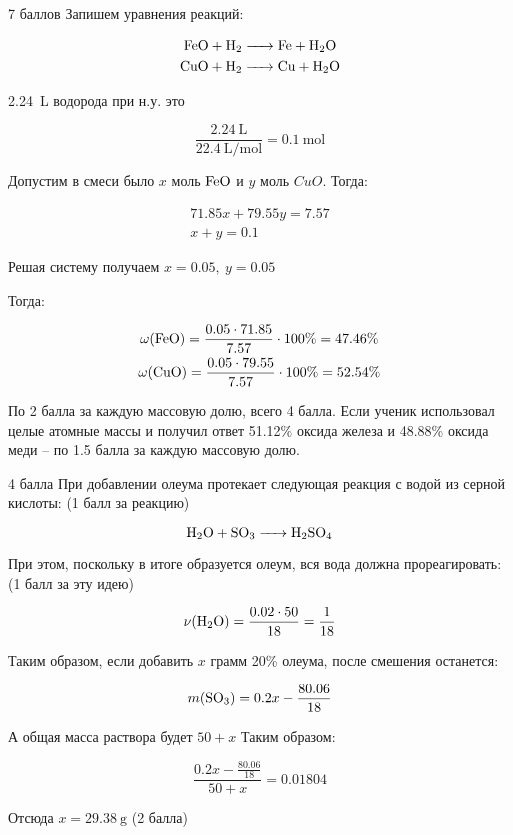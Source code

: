 \begin{solbox}{7 баллов}
  Запишем уравнения реакций:

  \begin{gather*}
    \ce{FeO + H2 -> Fe + H2O} \\
    \ce{CuO + H2 -> Cu + H2O}
  \end{gather*}

  \qty{2.24}{\liter} водорода при н.у. это

  \[
    \frac{\qty{2.24}{\liter}}{\qty{22.4}{\liter\per\mole}} = \qty{0.1}{\mole}
  \]

  Допустим в смеси было $x$ моль $\ce{FeO}$ и $y$ моль $CuO$. Тогда:

  \begin{gather*}
    71.85x + 79.55y = 7.57 \\
    x + y = 0.1
  \end{gather*}

  Решая систему получаем $x = 0.05, \ y = 0.05$

  Тогда:

  \begin{gather*}
    \omega(\ce{FeO}) = \frac{0.05 \cdot 71.85}{7.57} \cdot 100\% = 47.46\% \\
    \omega(\ce{CuO}) = \frac{0.05 \cdot 79.55}{7.57} \cdot 100\% = 52.54\%
  \end{gather*}
\end{solbox}

\begin{emptysolbox}
    По 2 балла за каждую массовую долю, всего 4 балла. Если ученик использовал целые атомные массы и получил ответ 51.12\% оксида железа и 48.88\% оксида меди – по 1.5 балла за каждую массовую долю.
\end{emptysolbox}




\begin{solbox}{4 балла}
  При добавлении олеума протекает следующая реакция с водой из серной кислоты: (1 балл за реакцию)

  \[
    \ce{H2O + SO3 -> H2SO4}
  \]

  При этом, поскольку в итоге образуется олеум, вся вода должна прореагировать: (1 балл за эту идею)

  \[
    \nu(\ce{H2O}) = \frac{0.02 \cdot 50}{18} = \frac{1}{18}
  \]

  Таким образом, если добавить $x$ грамм 20\% олеума, после смешения останется:

  \[
    m(\ce{SO3}) = 0.2 x - \frac{80.06}{18}
  \]

  А общая масса раствора будет $50+x$ Таким образом:

  \[
    \frac{0.2 x - \frac{80.06}{18}}{50 + x} = 0.01804
  \]

  Отсюда $x=\qty{29.38}{\gram}$ (2 балла)
\end{solbox}




